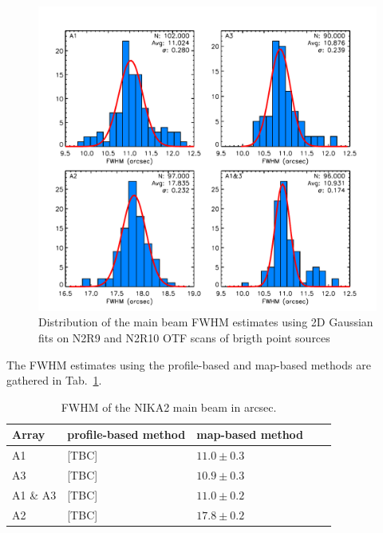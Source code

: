 \begin{figure}
\begin{center}
  \includegraphics[clip, angle=0, scale=0.7]{Figures/Main_Beam_FWHM_N2R9_10.pdf}
\caption{Distribution of the main beam FWHM estimates using 2D
  Gaussian fits on N2R9 and N2R10 OTF scans of brigth point sources}
\label{fig:fwhm_map}
\end{center}
\end{figure}


The FWHM estimates using the profile-based and map-based methods are gathered in Tab.~\ref{tab:fwhm}. 
\begin{table}
  \caption[]{FWHM of the NIKA2 main beam in arcsec.}
  \centering
  \begin{tabular}{|l|l|l|l|l|}
    \hline
    Array & profile-based method & map-based method \\
    \hline
    A1       & [TBC] & $11.0 \pm 0.3$ \\
    A3       & [TBC] & $10.9 \pm 0.3$ \\
    A1 \& A3 & [TBC] & $11.0 \pm 0.2$ \\
    A2       & [TBC] & $17.8 \pm 0.2$ \\
    \hline
  \end{tabular}
  \label{tab:fwhm}
\end{table}



